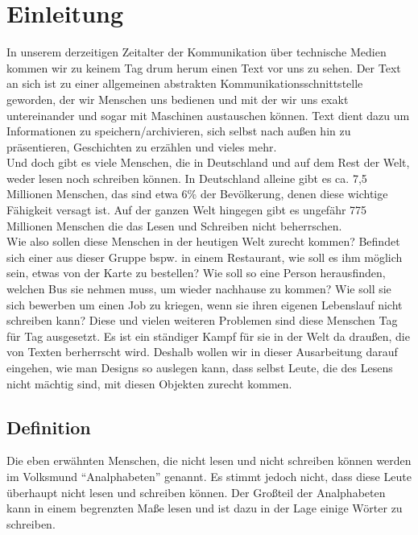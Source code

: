 \section{Einleitung}



In unserem derzeitigen Zeitalter der Kommunikation über technische Medien kommen wir zu keinem Tag drum herum einen Text vor uns zu sehen. Der Text an sich ist zu einer allgemeinen abstrakten Kommunikationsschnittstelle geworden, der wir Menschen uns bedienen und mit der wir uns exakt untereinander und sogar mit Maschinen austauschen können. Text dient dazu um Informationen zu speichern/archivieren, sich selbst nach außen hin zu präsentieren, Geschichten zu erzählen und vieles mehr.\\


Und doch gibt es viele Menschen, die in Deutschland und auf dem Rest der Welt, weder lesen noch schreiben können. In Deutschland alleine gibt es ca. 7,5 Millionen Menschen, das sind etwa 6\% der Bevölkerung, denen diese wichtige Fähigkeit versagt ist. Auf der ganzen Welt hingegen gibt es ungefähr 775 Millionen Menschen die das Lesen und Schreiben nicht beherrschen. \\


 Wie also sollen diese Menschen in der heutigen Welt zurecht kommen? Befindet sich einer aus dieser Gruppe bspw. in einem Restaurant, wie soll es ihm möglich sein, etwas von der Karte zu bestellen? Wie soll so eine Person herausfinden, welchen Bus sie nehmen muss, um wieder nachhause zu kommen? Wie soll sie sich bewerben um einen Job zu kriegen, wenn sie ihren eigenen Lebenslauf nicht schreiben kann? Diese und vielen weiteren Problemen sind diese Menschen Tag für Tag ausgesetzt. Es ist ein ständiger Kampf für sie in der Welt da draußen, die von Texten berherrscht wird. Deshalb wollen wir in dieser Ausarbeitung darauf eingehen, wie man Designs so auslegen kann, dass selbst Leute, die des Lesens nicht mächtig sind, mit diesen Objekten zurecht kommen.\\


\subsection{Definition}



Die eben erwähnten Menschen, die nicht lesen und nicht schreiben können werden im Volksmund "`Analphabeten"' genannt. Es stimmt jedoch nicht, dass diese Leute überhaupt nicht lesen und schreiben können. Der Großteil der Analphabeten kann in einem begrenzten Maße lesen und ist dazu in der Lage einige Wörter zu schreiben.\\


